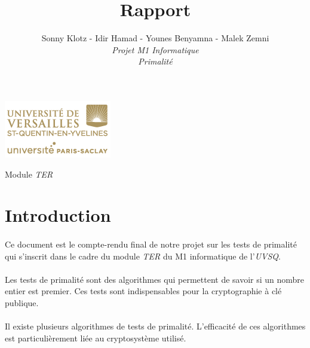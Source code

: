
\usepackage[french,frenchkw,ruled]{../tex/algorithm2e}

\title{\vspace{\fill}\textbf{\Huge Rapport}}
\author{
	Sonny Klotz - Idir Hamad - Younes Benyamna - Malek Zemni
	\vspace{2em}\\
	\textit{Projet M1 Informatique}\\\textit{Primalité}
	\vspace{2em}
}


\clearpage
\maketitle\vspace{9em}
\begin{center}\includegraphics[scale=0.7]{logo.png}\end{center}
\begin{flushright}Module \textit{TER}\end{flushright}
\newpage
\tableofcontents
\newpage\clearpage{}

	\section*{Introduction}
	
	\paragraph{}Ce document est le compte-rendu final de notre projet sur les tests de primalité qui s'inscrit dans le cadre du module \textit{TER} du M1 informatique de l'\textit{UVSQ}.
	\paragraph{}Les tests de primalité sont des algorithmes qui permettent de savoir si un nombre entier est premier. Ces tests sont indispensables pour la cryptographie à clé publique.
	\paragraph{}Il existe plusieurs algorithmes de tests de primalité. L'efficacité de ces algorithmes est particulièrement liée au cryptosystème utilisé. 
